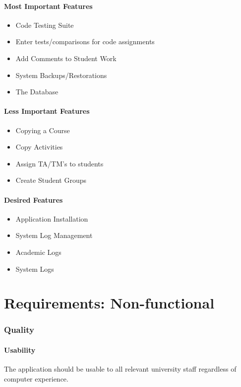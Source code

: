 \documentclass{article}
\begin{document}
\subsection{Most Important Features}
\begin{itemize}
  \item Code Testing Suite
  \item Enter tests/comparisons for code assignments
  \item Add Comments to Student Work
  \item System Backups/Restorations
  \item The Database
\end{itemize}

\subsection{Less Important Features}
\begin{itemize}
  \item Copying a Course
  \item Copy Activities
  \item Assign TA/TM's to students
  \item Create Student Groups
\end{itemize}

\subsection{Desired Features}
\begin{itemize}
  \item Application Installation
  \item System Log Management
  \item Academic Logs
  \item System Logs
\end{itemize}

\part{Requirements: Non-functional}
\section{Quality}
\subsection{Usability}
The application should be usable to all relevant university staff
regardless of computer experience.
\end{document}

